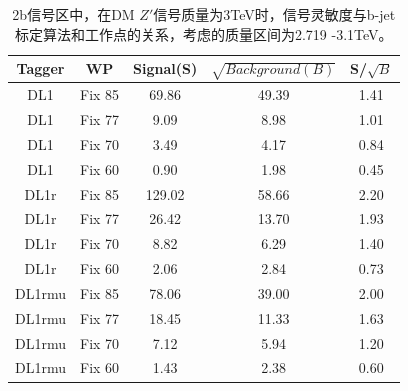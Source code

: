 \begin{table}[ht]
	\begin{center}
		\begin{tabular}{|c|c|c|c|c|}\hline
			Tagger       & WP          & Signal(S)    & $\sqrt{Background(B)}$    & S/$\sqrt{B}$ \\
			\hline
			DL1          & Fix 85      & 69.86     & 49.39        & 1.41        \\
			DL1          & Fix 77      & 9.09      & 8.98         & 1.01        \\
			DL1          & Fix 70      & 3.49      & 4.17         & 0.84        \\
			DL1          & Fix 60      & 0.90      & 1.98         & 0.45        \\
			\hline
			DL1r          & Fix 85      & 129.02     & 58.66       & 2.20        \\
			DL1r          & Fix 77      & 26.42      & 13.70       & 1.93        \\
			DL1r          & Fix 70      & 8.82       & 6.29        & 1.40        \\
			DL1r          & Fix 60      & 2.06       & 2.84        & 0.73        \\
			\hline
			DL1rmu          & Fix 85      & 78.06     & 39.00       & 2.00        \\
			DL1rmu          & Fix 77      & 18.45     & 11.33       & 1.63        \\
			DL1rmu          & Fix 70      & 7.12      & 5.94        & 1.20        \\
			DL1rmu          & Fix 60      & 1.43      & 2.38        & 0.60        \\
			\hline
		\end{tabular}
	\end{center}
	\caption{
	2b信号区中，在DM $Z\prime$信号质量为3TeV时，信号灵敏度与b-jet标定算法和工作点的关系，考虑的质量区间为2.719 -3.1TeV。
	}
	\label{tab:SenZ3TeV}
\end{table}

